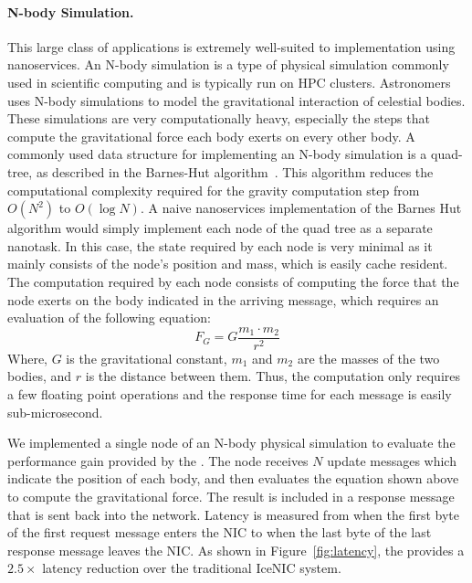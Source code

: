 \paragraph{N-body Simulation.} This large class of applications is extremely well-suited to implementation using nanoservices.
An N-body simulation is a type of physical simulation commonly used in scientific computing and is typically run on HPC clusters.
Astronomers uses N-body simulations to model the gravitational interaction of celestial bodies.
These simulations are very computationally heavy, especially the steps that compute the gravitational force each body exerts on every other body.
A commonly used data structure for implementing an N-body simulation is a quad-tree, as described in the Barnes-Hut algorithm~\cite{barnes-hut}.
This algorithm reduces the computational complexity required for the gravity computation step from $O(N^2)$ to $O(\log N)$.
A naive nanoservices implementation of the Barnes Hut algorithm would simply implement each node of the quad tree as a separate nanotask.
In this case, the state required by each node is very minimal as it mainly consists of the node's position and mass, which is easily cache resident.
The computation required by each node consists of computing the force that the node exerts on the body indicated in the arriving message, which requires an evaluation of the following equation:
$$ F_G = G\frac{m_1 \cdot m_2}{r^2} $$
Where, $G$ is the gravitational constant, $m_1$ and $m_2$ are the masses of the two bodies, and $r$ is the distance between them.
Thus, the computation only requires a few floating point operations and the response time for each message is easily sub-microsecond.

We implemented a single node of an N-body physical simulation to evaluate the performance gain provided by the \name{}.
The node receives $N$ update messages which indicate the position of each body, and then evaluates the equation shown above to compute the gravitational force.
The result is included in a response message that is sent back into the network.
Latency is measured from when the first byte of the first request message enters the NIC to when the last byte of the last response message leaves the NIC.
As shown in Figure~\ref{fig:latency}, the \name{} provides a $2.5\times$ latency reduction over the traditional IceNIC system.


